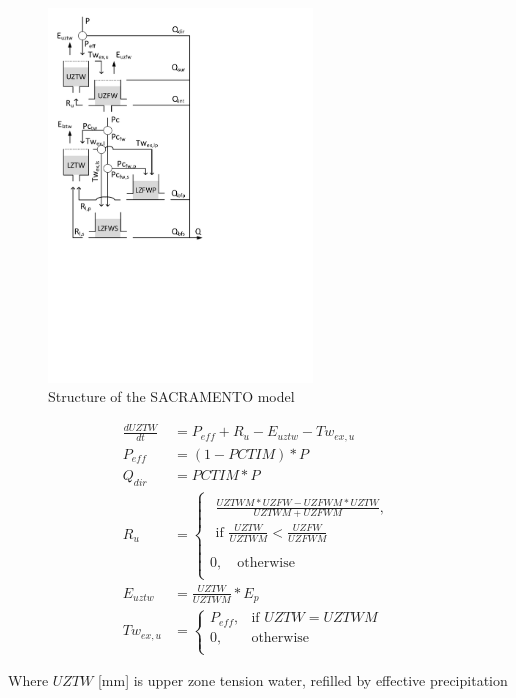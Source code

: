 { 																	%
\begin{figure}
\includegraphics[trim=1cm 11cm 7cm 1cm,width=7cm,keepaspectratio]{./files/33_schematic.pdf}
\caption{Structure of the SACRAMENTO model} \label{fig:33_schematic}
\end{figure}

\begin{align}
	\frac{dUZTW}{dt} &= P_{eff} + R_u -E_{uztw}-Tw_{ex,u} \\
	P_{eff} &= (1-PCTIM)*P\\
	Q_{dir} &= PCTIM*P\\
	R_u &= \begin{cases} 
		\begin{aligned}
			\frac{UZTWM*UZFW-UZFWM*UZTW}{UZTWM+UZFWM}, \\	
			\text{if } \frac{UZTW}{UZTWM} < \frac{UZFW}{UZFWM} \\
		\end{aligned}\\
		0, \quad \text{otherwise} \\
	\end{cases}\\
	E_{uztw} &= \frac{UZTW}{UZTWM}*E_p\\
	Tw_{ex,u} &= \begin{cases}
		P_{eff}, &\text{if } UZTW = UZTWM \\
		0, & \text{otherwise} \\
	\end{cases} 
\end{align}

Where $UZTW$ [mm] is upper zone tension water, refilled by effective precipitation 

} %

